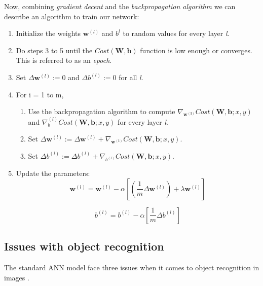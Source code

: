Now, combining \textit{gradient decent} and the \textit{backpropagation algorithm} we can describe an algorithm to train our network: 

\begin{enumerate}
	\item Initialize the weights $ \mathbf{w}^{(l)} $ and $ b^{l} $ to random values for every layer \textit{l}.
	\item Do steps 3 to 5 until the $ Cost(\mathbf{W, b}) $ function is low enough or converges. This is referred to as an \textit{epoch}. 
	\item Set $ \Delta\mathbf{w}^{(l)} := 0 $ and $ \Delta b^{(l)} := 0 $ for all \textit{l}.
	\item For i = 1 to m,
		\begin{enumerate}
			\item Use the backpropagation algorithm to compute $ \nabla_\mathbf{w^{(l)}}Cost(\mathbf{W, b};x,y) $ and $ \nabla_b^{(l)}Cost(\mathbf{W, b};x,y) $ for every layer \textit{l}.
			\item  Set $ \Delta\mathbf{w}^{(l)} := \Delta\mathbf{w}^{(l)} + \nabla_\mathbf{w^{(l)}}Cost(\mathbf{W, b};x,y) $. 
			\item  Set $ \Delta b^{(l)} := \Delta b^{(l)} + \nabla_{b^{(l)}}Cost(\mathbf{W, b};x,y) $. 
		\end{enumerate}
	\item Update the parameters:
		\begin{equation}
			\mathbf{w}^{(l)} = \mathbf{w}^{(l)} - \alpha[(\frac{1}{m}\Delta\mathbf{w}^{(l)}) + \lambda\mathbf{w}^{(l)}]
		\end{equation}
		
		\begin{equation}
			b^{(l)} = b^{(l)} - \alpha[\frac{1}{m}\Delta b^{(l)}]
		\end{equation}
\end{enumerate}

\subsection{Issues with object recognition}\label{ann_issues}

The standard ANN model face three issues when it comes to object recognition in images \cite{LeCun1998}. 

